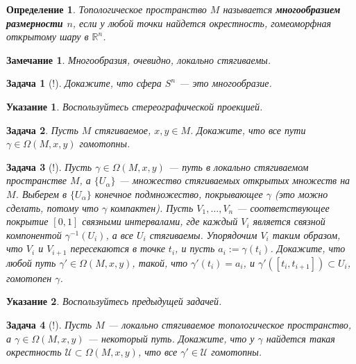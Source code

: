 \documentclass[12pt]{book}
\def\R{{\mathbb R}}
\theoremstyle{upshape}
\newtheorem{zadacha}{Задача}[chapter]
\theoremstyle{generic}
\newtheorem{opredelenie}[teorema]{Определение}
\theoremstyle{upshapenonumber}
\newtheorem{ukazanie}{Указание}[section]
\newtheorem{zamechanie}{Замечание}[chapter]
\newcommand{\следствие}{%
     \refstepcounter{teorema}
     {\noindent\bf Следствие \thechapter.\arabic{teorema}:\ }}
\newcommand{\пример}{%
     \refstepcounter{teorema}
     {\noindent\bf Пример \thechapter.\arabic{teorema}:\ }}
\newcommand{\лемма}{%
     \refstepcounter{teorema}
     {\noindent\bf Лемма \thechapter.\arabic{teorema}:\ }}
\newcommand{\теорема}{%
     \refstepcounter{teorema}
     {\noindent\bf Теорема \thechapter.\arabic{teorema}:\ }}
\newcommand{\утверждение}{%
     \refstepcounter{teorema}
     {\noindent\bf Утверждение \thechapter.\arabic{teorema}:\ }}
\begin{document}
{\begin{opredelenie} 
Топологическое пространство $M$ 
называется {\bf многообразием размерности $n$}, если 
у любой точки найдется окрестность, гомеоморфная
открытому шару в $\R^n$.
\end{opredelenie}

\begin{zamechanie}
Многообразия, очевидно, локально стягиваемы.
\end{zamechanie}

\begin{zadacha}[!]
Докажите, что сфера $S^n$ --- это многообразие.
\end{zadacha}

\begin{ukazanie} 
Воспользуйтесь стереографической проекцией.
\end{ukazanie}

\begin{zadacha}
Пусть $M$ стягиваемое, $x,y\in M$. Докажите,
что все пути $\gamma\in \Omega(M, x,y)$ гомотопны.
\end{zadacha}

\begin{zadacha}[!]
Пусть $\gamma\in \Omega(M, x,y)$ --- путь в локально стягиваемом
пространстве $M$, а $\{U_\alpha\}$ --- множество стягиваемых открытых
множеств на $M$. Выберем в $\{U_\alpha\}$ конечное подмножество,
покрывающее $\gamma$ (это можно сделать, потому что $\gamma$
компактен).  Пусть $V_1,\dots,V_n$ --- соответствующее покрытие
$[0,1]$ связными интервалами, где каждый $V_i$ является связной
компонентой $\gamma^{-1}(U_i)$, а все $U_i$ стягиваемы. Упорядочим
$V_i$ таким образом, что $V_i$ и $V_{i+1}$ пересекаются в точке
$t_i$, и пусть $a_i := \gamma(t_i)$. Докажите, что любой путь
$\gamma'\in \Omega(M, x,y)$, такой, что $\gamma'(t_i)=a_i$, и
$\gamma'([t_i, t_{i+1}])\subset U_i$, гомотопен $\gamma$.
\end{zadacha}

\begin{ukazanie} Воспользуйтесь предыдущей задачей.
\end{ukazanie}

\begin{zadacha}[!] \label{_gomoto_bli_petli_Zadacha_}
Пусть $M$ --- локально стягиваемое топологическое
пространство, а $\gamma\in \Omega(M, x,y)$ --- некоторый
путь. Докажите, что у $\gamma$ найдется такая окрестность
${\mathcal U}\subset \Omega(M, x,y)$, что все 
$\gamma'\in {\mathcal U}$ гомотопны.
\end{zadacha}

}
\end{document}
